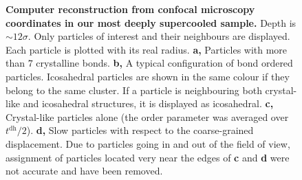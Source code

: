 \begin{figure}
	\caption{\textbf{Computer reconstruction from confocal microscopy coordinates in our most deeply supercooled sample.} Depth is $\sim 12\sigma$. Only particles of interest and their neighbours are displayed. Each particle is plotted with its real radius. \textbf{a,} Particles with more than $7$ crystalline bonds. \textbf{b,} A typical configuration of bond ordered particles. Icosahedral particles are shown in the same colour if they belong to the same cluster. If a particle is neighbouring both crystal-like and icosahedral structures, it is displayed as icosahedral. \textbf{c,} Crystal-like particles alone (the order parameter was averaged over $t^\text{dh}/2$). \textbf{d,} Slow particles with respect to the coarse-grained displacement. Due to particles going in and out of the field of view, assignment of particles located very near the edges of \textbf{c} and \textbf{d} were not accurate and have been removed.}
	\label{fig:3D}
\end{figure}

